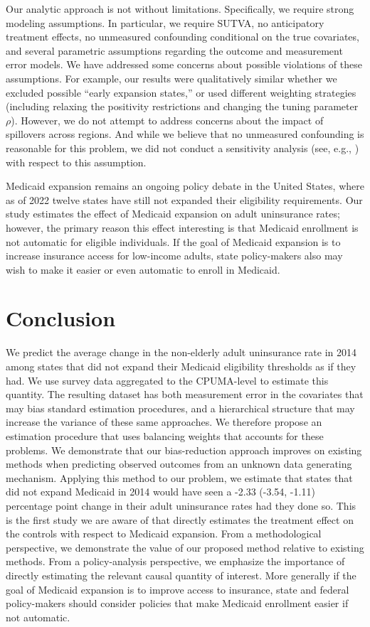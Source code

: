 \documentclass[aoas]{imsart}
\theoremstyle{plain}
\theoremstyle{remark}
\begin{document}
Our analytic approach is not without limitations. Specifically, we require strong modeling assumptions. In particular, we require SUTVA, no anticipatory treatment effects, no unmeasured confounding conditional on the true covariates, and several parametric assumptions regarding the outcome and measurement error models. We have addressed some concerns about possible violations of these assumptions. For example, our results were qualitatively similar whether we excluded possible ``early expansion states,'' or used different weighting strategies (including relaxing the positivity restrictions and changing the tuning parameter $\rho$). However, we do not attempt to address concerns about the impact of spillovers across regions. And while we believe that no unmeasured confounding is reasonable for this problem, we did not conduct a sensitivity analysis (see, e.g., \cite{bonvini2021sensitivity}) with respect to this assumption. 

Medicaid expansion remains an ongoing policy debate in the United States, where as of 2022 twelve states have still not expanded their eligibility requirements. Our study estimates the effect of Medicaid expansion on adult uninsurance rates; however, the primary reason this effect interesting is that Medicaid enrollment is not automatic for eligible individuals. If the goal of Medicaid expansion is to increase insurance access for low-income adults, state policy-makers also may wish to make it easier or even automatic to enroll in Medicaid. 

\section{Conclusion}

We predict the average change in the non-elderly adult uninsurance rate in 2014 among states that did not expand their Medicaid eligibility thresholds as if they had. We use survey data aggregated to the CPUMA-level to estimate this quantity. The resulting dataset has both measurement error in the covariates that may bias standard estimation procedures, and a hierarchical structure that may increase the variance of these same approaches. We therefore propose an estimation procedure that uses balancing weights that accounts for these problems. We demonstrate that our bias-reduction approach improves on existing methods when predicting observed outcomes from an unknown data generating mechanism. Applying this method to our problem, we estimate that states that did not expand Medicaid in 2014 would have seen a -2.33 (-3.54, -1.11) percentage point change in their adult uninsurance rates had they done so. This is the first study we are aware of that directly estimates the treatment effect on the controls with respect to Medicaid expansion. From a methodological perspective, we demonstrate the value of our proposed method relative to existing methods. From a policy-analysis perspective, we emphasize the importance of directly estimating the relevant causal quantity of interest. More generally if the goal of Medicaid expansion is to improve access to insurance, state and federal policy-makers should consider policies that make Medicaid enrollment easier if not automatic.
\end{document}
